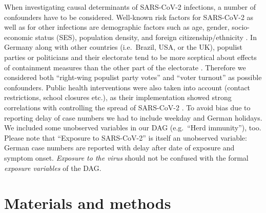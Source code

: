 \documentclass[10pt,letterpaper]{article}
\begin{document}
When investigating causal determinants of SARS-CoV-2 infections, a
number of confounders have to be considered. Well-known risk factors for
SARS-CoV-2 as well as for other infections are demographic factors such
as age, gender, socio-economic status (SES), population density, and
foreign citizenship/ethnicity
\cite{de2020risk, Dragano2020.06.17.20133918, jhucovid19db2020}. In
Germany along with other countries (i.e.~Brazil, USA, or the UK),
populist parties or politicians and their electorate tend to be more
sceptical about effects of containment measures than the other part of
the electorate \cite{dohle_wingen_schreiber_2020, engle_staying_2020}.
Therefore we considered both ``right-wing populist party votes'' and
``voter turnout'' as possible confounders. Public health interventions
were also taken into account (contact restrictions, school closures
etc.), as their implementation showed strong correlations with
controlling the spread of SARS-CoV-2
\cite{cowling2020impact, juni_impact_2020, lai_effect_2020}. To avoid
bias due to reporting delay of case numbers we had to include weekday
and German holidays. We included some unobserved variables in our DAG
(e.g.~``Herd immunity''), too. Please note that ``Exposure to
SARS-CoV-2'' is itself an unobserved variable: German case numbers are
reported with delay after date of exposure and symptom onset.
\emph{Exposure to the virus} should not be confused with the formal
\emph{exposure variables} of the DAG.




\section*{Materials and methods}
\end{document}

